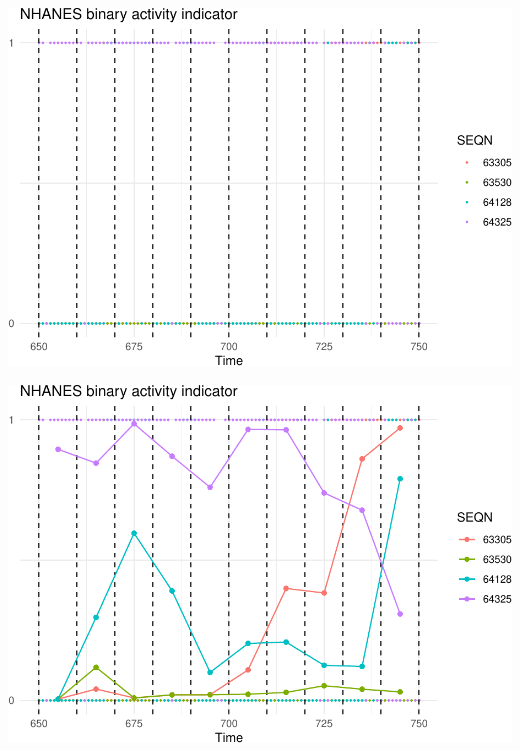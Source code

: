 \documentclass[
]{article}
\begin{document}
\includegraphics{manuscript_files/figure-latex/binning-1.pdf}

\includegraphics{manuscript_files/figure-latex/unnamed-chunk-11-1.pdf}
\end{document}
